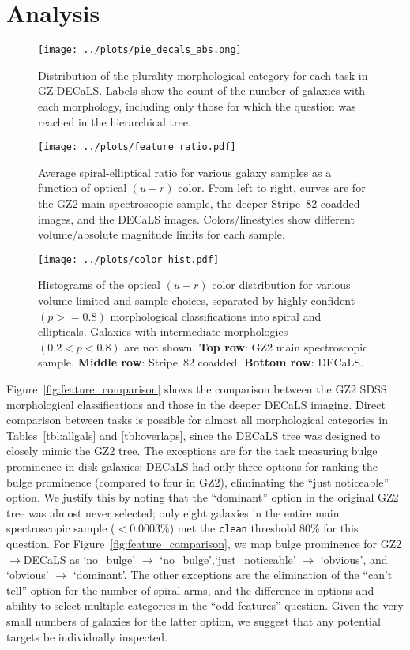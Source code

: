 \documentclass[iop,apj,tighten]{emulateapj}
\begin{document}
\section{Analysis}

\begin{figure*}
\centering
\texttt{[image: ../plots/pie\_decals\_abs.png]}
\caption{Distribution of the plurality morphological category for each task in GZ:DECaLS. Labels show the count of the number of galaxies with each morphology, including only those for which the question was reached in the hierarchical tree.\label{fig:pie}}
\end{figure*}

\begin{figure*}
\centering
\texttt{[image: ../plots/feature\_ratio.pdf]}
\caption{Average spiral-elliptical ratio for various galaxy samples as a function of optical $(u-r)$ color. From left to right, curves are for the GZ2 main spectroscopic sample, the deeper Stripe~82 coadded images, and the DECaLS images. Colors/linestyles show different volume/absolute magnitude limits for each sample.\label{fig:feature_ratio}}
\end{figure*}

\begin{figure*}
\centering
\texttt{[image: ../plots/color\_hist.pdf]}
\caption{Histograms of the optical $(u-r)$ color distribution for various volume-limited and sample choices, separated by highly-confident $(p >= 0.8)$ morphological classifications into spiral and ellipticals. Galaxies with intermediate morphologies $(0.2 < p < 0.8)$ are not shown. \textbf{Top row}: GZ2 main spectroscopic sample. \textbf{Middle row}: Stripe~82 coadded. \textbf{Bottom row}: DECaLS. \label{fig:color_hist}}
\end{figure*}

Figure~\ref{fig:feature_comparison} shows the comparison between the GZ2 SDSS morphological classifications and those in the deeper DECaLS imaging. Direct comparison between tasks is possible for almost all morphological categories in Tables~\ref{tbl:allgals} and \ref{tbl:overlaps}, since the DECaLS tree was designed to closely mimic the GZ2 tree. The exceptions are for the task measuring bulge prominence in disk galaxies; DECaLS had only three options for ranking the bulge prominence (compared to four in GZ2), eliminating the ``just noticeable'' option. We justify this by noting that the ``dominant'' option in the original GZ2 tree was almost never selected; only eight galaxies in the entire main spectroscopic sample ($<0.0003\%$) met the \texttt{clean} threshold 80\% for this question. For Figure~\ref{fig:feature_comparison}, we map bulge prominence for GZ2$\rightarrow$DECaLS as `no\_bulge' $\rightarrow$ `no\_bulge',`just\_noticeable' $\rightarrow$ `obvious', and `obvious' $\rightarrow$ `dominant'. The other exceptions are the elimination of the ``can't tell'' option for the number of spiral arms, and the difference in options and ability to select multiple categories in the ``odd features'' question. Given the very small numbers of galaxies for the latter option, we suggest that any potential targets be individually inspected. 
\end{document}
